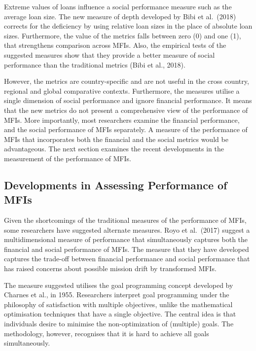 \documentclass[a4paper, nobind]{templates/ociamthesis}
\begin{document}
Extreme values of loans influence a social performance measure such as the average loan size. The new measure of depth developed by Bibi et al.~(2018) corrects for the deficiency by using relative loan sizes in the place of absolute loan sizes. Furthermore, the value of the metrics falls between zero (0) and one (1), that strengthens comparison across MFIs. Also, the empirical tests of the suggested measures show that they provide a better measure of social performance than the traditional metrics (Bibi et al., 2018).

However, the metrics are country-specific and are not useful in the cross country, regional and global comparative contexts. Furthermore, the measures utilise a single dimension of social performance and ignore financial performance. It means that the new metrics do not present a comprehensive view of the performance of MFIs. More importantly, most researchers examine the financial performance, and the social performance of MFIs separately. A measure of the performance of MFIs that incorporates both the financial and the social metrics would be advantageous. The next section examines the recent developments in the measurement of the performance of MFIs.

\hypertarget{developments-in-assessing-performance-of-mfis}{%
\subsection{Developments in Assessing Performance of MFIs}\label{developments-in-assessing-performance-of-mfis}}

Given the shortcomings of the traditional measures of the performance of MFIs, some researchers have suggested alternate measures. Royo et al.~(2017) suggest a multidimensional measure of performance that simultaneously captures both the financial and social performance of MFIs. The measure that they have developed captures the trade-off between financial performance and social performance that has raised concerns about possible mission drift by transformed MFIs.

The measure suggested utilises the goal programming concept developed by Charnes et al., in 1955. Researchers interpret goal programming under the philosophy of satisfaction with multiple objectives, unlike the mathematical optimisation techniques that have a single objective. The central idea is that individuals desire to minimise the non-optimization of (multiple) goals. The methodology, however, recognises that it is hard to achieve all goals simultaneously.
\end{document}
